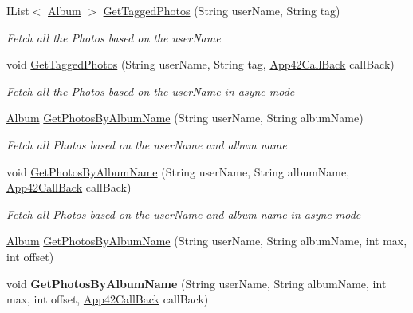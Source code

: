 \begin{DoxyCompactItemize}
I\+List$<$ \hyperlink{classcom_1_1shephertz_1_1app42_1_1paas_1_1sdk_1_1csharp_1_1gallery_1_1_album}{Album} $>$ \hyperlink{classcom_1_1shephertz_1_1app42_1_1paas_1_1sdk_1_1csharp_1_1gallery_1_1_photo_service_a32c920dfdefe334a508362531a88f9e5}{Get\+Tagged\+Photos} (String user\+Name, String tag)
\begin{DoxyCompactList}\small\item\em Fetch all the Photos based on the user\+Name \end{DoxyCompactList}\item 
void \hyperlink{classcom_1_1shephertz_1_1app42_1_1paas_1_1sdk_1_1csharp_1_1gallery_1_1_photo_service_a82ff0dcf2ce9950142586ca7cd12f61b}{Get\+Tagged\+Photos} (String user\+Name, String tag, \hyperlink{interfacecom_1_1shephertz_1_1app42_1_1paas_1_1sdk_1_1csharp_1_1_app42_call_back}{App42\+Call\+Back} call\+Back)
\begin{DoxyCompactList}\small\item\em Fetch all the Photos based on the user\+Name in async mode \end{DoxyCompactList}\item 
\hyperlink{classcom_1_1shephertz_1_1app42_1_1paas_1_1sdk_1_1csharp_1_1gallery_1_1_album}{Album} \hyperlink{classcom_1_1shephertz_1_1app42_1_1paas_1_1sdk_1_1csharp_1_1gallery_1_1_photo_service_a63a7ce3473260db7e3bf3b808a753da8}{Get\+Photos\+By\+Album\+Name} (String user\+Name, String album\+Name)
\begin{DoxyCompactList}\small\item\em Fetch all Photos based on the user\+Name and album name \end{DoxyCompactList}\item 
void \hyperlink{classcom_1_1shephertz_1_1app42_1_1paas_1_1sdk_1_1csharp_1_1gallery_1_1_photo_service_a8a84bd844646e831cf7ce75417e0f602}{Get\+Photos\+By\+Album\+Name} (String user\+Name, String album\+Name, \hyperlink{interfacecom_1_1shephertz_1_1app42_1_1paas_1_1sdk_1_1csharp_1_1_app42_call_back}{App42\+Call\+Back} call\+Back)
\begin{DoxyCompactList}\small\item\em Fetch all Photos based on the user\+Name and album name in async mode \end{DoxyCompactList}\item 
\hyperlink{classcom_1_1shephertz_1_1app42_1_1paas_1_1sdk_1_1csharp_1_1gallery_1_1_album}{Album} \hyperlink{classcom_1_1shephertz_1_1app42_1_1paas_1_1sdk_1_1csharp_1_1gallery_1_1_photo_service_a1700a679c566d362820f14d888cbb949}{Get\+Photos\+By\+Album\+Name} (String user\+Name, String album\+Name, int max, int offset)
\item 
\hypertarget{classcom_1_1shephertz_1_1app42_1_1paas_1_1sdk_1_1csharp_1_1gallery_1_1_photo_service_a7316969505e7295caa3d8772a9dc3a0c}{void {\bfseries Get\+Photos\+By\+Album\+Name} (String user\+Name, String album\+Name, int max, int offset, \hyperlink{interfacecom_1_1shephertz_1_1app42_1_1paas_1_1sdk_1_1csharp_1_1_app42_call_back}{App42\+Call\+Back} call\+Back)}\label{classcom_1_1shephertz_1_1app42_1_1paas_1_1sdk_1_1csharp_1_1gallery_1_1_photo_service_a7316969505e7295caa3d8772a9dc3a0c}


\end{DoxyCompactItemize}
